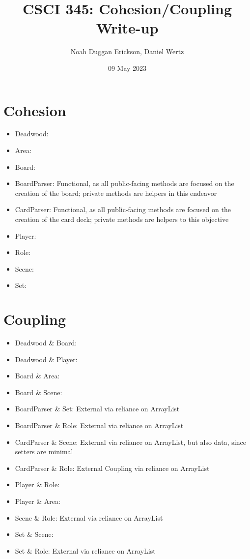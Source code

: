 \documentclass[letterpaper, twoside]{report}
\title{CSCI 345: Cohesion/Coupling Write-up}
\author{Noah Duggan Erickson, Daniel Wertz}
\date{09 May 2023}
\begin{document}
\maketitle

\chapter{Cohesion}
\begin{itemize}
    \item Deadwood:
    \item Area:
    \item Board:
    \item BoardParser: Functional, as all public-facing methods are focused on the creation of the board; private methods are helpers in this endeavor
    \item CardParser: Functional, as all public-facing methods are focused on the creation of the card deck; private methods are helpers to this objective
    \item Player:
    \item Role:
    \item Scene:
    \item Set:
\end{itemize}
\chapter{Coupling}
\begin{itemize}
    \item Deadwood \& Board:
    \item Deadwood \& Player:
    \item Board \& Area:
    \item Board \& Scene:
    \item BoardParser \& Set: External via reliance on ArrayList
    \item BoardParser \& Role: External via reliance on ArrayList
    \item CardParser \& Scene: External via reliance on ArrayList, but also data, since setters are minimal
    \item CardParser \& Role: External Coupling via reliance on ArrayList
    \item Player \& Role:
    \item Player \& Area:
    \item Scene \& Role: External via reliance on ArrayList
    \item Set \& Scene:
    \item Set \& Role: External via reliance on ArrayList
\end{itemize}
\end{document}
